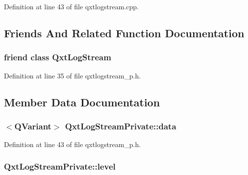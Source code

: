 Definition at line 43 of file qxtlogstream.\-cpp.



\subsection{Friends And Related Function Documentation}
\hypertarget{class_qxt_log_stream_private_a1ce7c3fc8251f2485738e5fe5e126440}{
\subsubsection[{Qxt\-Log\-Stream}]{\setlength{\rightskip}{0pt plus 5cm}friend class {\bf Qxt\-Log\-Stream}\hspace{0.3cm}{\ttfamily [friend]}}}\label{class_qxt_log_stream_private_a1ce7c3fc8251f2485738e5fe5e126440}


Definition at line 35 of file qxtlogstream\-\_\-p.\-h.



\subsection{Member Data Documentation}
\hypertarget{class_qxt_log_stream_private_adbb8dcaa228f8faf903fcdc7f7fac98b}{
\subsubsection[{data}]{$<$Q\-Variant$>$ Qxt\-Log\-Stream\-Private\-::data}}\label{class_qxt_log_stream_private_adbb8dcaa228f8faf903fcdc7f7fac98b}


Definition at line 43 of file qxtlogstream\-\_\-p.\-h.

\hypertarget{class_qxt_log_stream_private_aab2276f656699d017ddfc35532282b1c}{
\subsubsection[{level}]{ Qxt\-Log\-Stream\-Private\-::level}}\label{class_qxt_log_stream_private_aab2276f656699d017ddfc35532282b1c}


